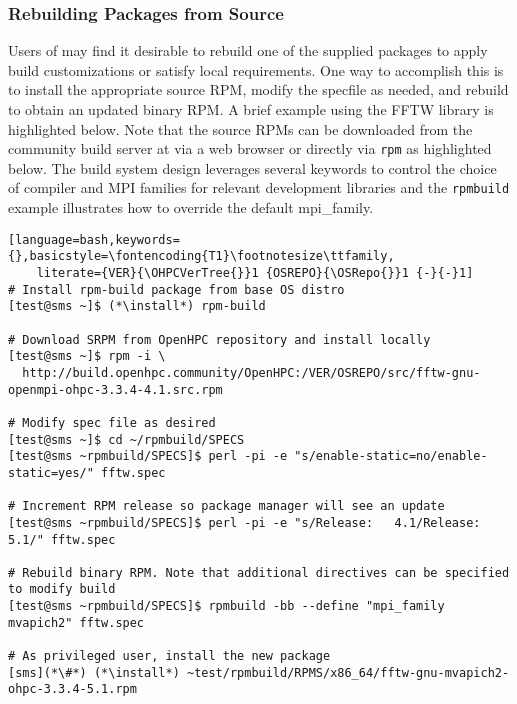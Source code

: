\subsubsection{Rebuilding Packages from Source}  \label{appendix:rpmbuild}

Users of \OHPC{} may find it desirable to rebuild one of the supplied packages
to apply build customizations or satisfy local requirements. One way to
accomplish this is to install the appropriate source RPM, modify the specfile
as needed, and rebuild to obtain an updated binary RPM. A brief example using
the FFTW library is highlighted below.  Note that the source RPMs can be downloaded from the
community build server at \href{https://build.openhpc.community}
{\color{blue}{https://build.openhpc.community}} via a web browser or directly
via \texttt{rpm} as highlighted below. The \OHPC{} build system design
leverages several keywords to control the choice of compiler and MPI families
for relevant development libraries and the \texttt{rpmbuild} example
illustrates how to override the default mpi\_family.

\begin{lstlisting}[language=bash,keywords={},basicstyle=\fontencoding{T1}\footnotesize\ttfamily,
    literate={VER}{\OHPCVerTree{}}1 {OSREPO}{\OSRepo{}}1 {-}{-}1]
# Install rpm-build package from base OS distro
[test@sms ~]$ (*\install*) rpm-build

# Download SRPM from OpenHPC repository and install locally
[test@sms ~]$ rpm -i \
  http://build.openhpc.community/OpenHPC:/VER/OSREPO/src/fftw-gnu-openmpi-ohpc-3.3.4-4.1.src.rpm

# Modify spec file as desired
[test@sms ~]$ cd ~/rpmbuild/SPECS
[test@sms ~rpmbuild/SPECS]$ perl -pi -e "s/enable-static=no/enable-static=yes/" fftw.spec

# Increment RPM release so package manager will see an update
[test@sms ~rpmbuild/SPECS]$ perl -pi -e "s/Release:   4.1/Release:   5.1/" fftw.spec

# Rebuild binary RPM. Note that additional directives can be specified to modify build
[test@sms ~rpmbuild/SPECS]$ rpmbuild -bb --define "mpi_family mvapich2" fftw.spec

# As privileged user, install the new package
[sms](*\#*) (*\install*) ~test/rpmbuild/RPMS/x86_64/fftw-gnu-mvapich2-ohpc-3.3.4-5.1.rpm
\end{lstlisting}
